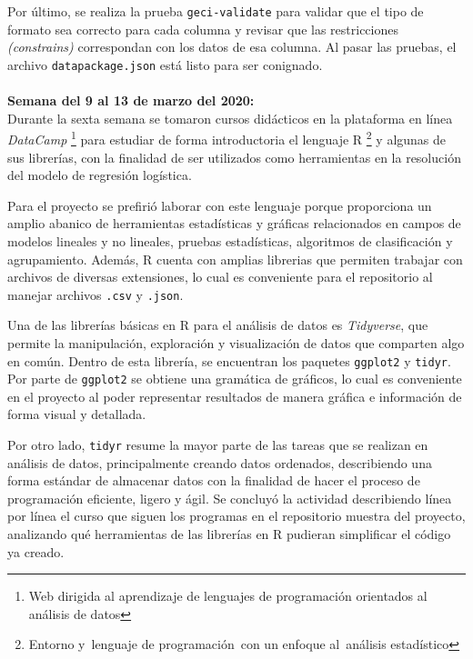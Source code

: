 \documentclass{article}
\begin{document}
    Por último, se realiza la prueba \texttt{geci-validate} para validar  que el tipo de formato sea correcto para cada columna y revisar que las restricciones \textit{(constrains)} correspondan con los datos de esa columna. Al pasar las pruebas, el archivo \texttt{datapackage.json} está listo para ser conignado.
    \\ \\
    
    \textbf{Semana del 9 al 13 de marzo del 2020:} \\
    Durante la sexta semana se tomaron cursos didácticos en la plataforma en línea \textit{DataCamp} \footnote{Web dirigida al aprendizaje de lenguajes de programación orientados al análisis de datos} para estudiar de forma introductoria el lenguaje R \footnote{Entorno y lenguaje de programación con un enfoque al análisis estadístico} y algunas de sus librerías, con la finalidad de ser utilizados como herramientas en la resolución del modelo de regresión logística.

    Para el proyecto se prefirió laborar con este lenguaje porque proporciona un amplio abanico de herramientas estadísticas y gráficas relacionados en campos de modelos lineales y no lineales, pruebas estadísticas, algoritmos de clasificación y agrupamiento. Además, R cuenta con amplias librerias que permiten trabajar con archivos de diversas extensiones, lo cual es conveniente para el repositorio al manejar archivos \texttt{.csv} y \texttt{.json}.

    Una de las librerías básicas en R para el análisis de datos es \textit{Tidyverse}, que permite la manipulación, exploración y visualización de datos que comparten algo en común. Dentro de esta librería, se encuentran los paquetes \texttt{ggplot2} y \texttt{tidyr}. Por parte de \texttt{ggplot2} se obtiene una gramática de gráficos, lo cual es conveniente en el proyecto al poder representar resultados de manera gráfica e información de forma visual y detallada.
    
    Por otro lado, \texttt{tidyr} resume la mayor parte de las tareas que se realizan en análisis de datos, principalmente creando datos ordenados, describiendo una forma estándar de almacenar datos con la finalidad de hacer el proceso de programación eficiente, ligero y ágil.
    Se concluyó la actividad describiendo línea por línea el curso que siguen los programas en el repositorio muestra del proyecto, analizando qué herramientas de las librerías en R pudieran simplificar el código ya creado.
\end{document}
